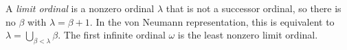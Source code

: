 
A \emph{limit ordinal} is a nonzero ordinal $\lambda$ that is not a successor ordinal, so there is no $\beta$ with $\lambda=\beta+1$. In the von Neumann representation, this is equivalent to $\lambda=\bigcup_{\beta<\lambda}\beta$. The first infinite ordinal $\omega$ is the least nonzero limit ordinal.
